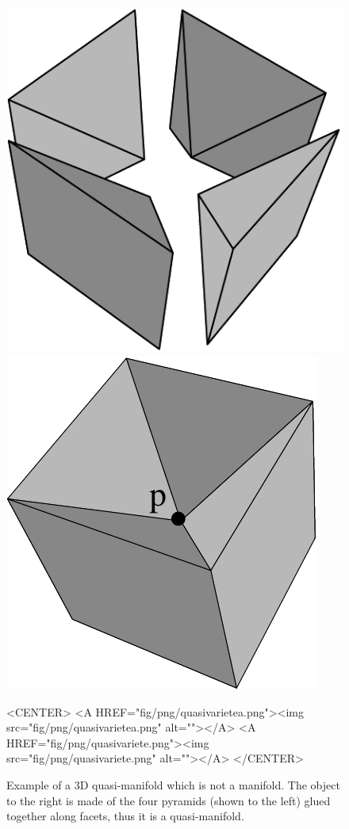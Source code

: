 \begin{figure}
  \begin{ccTexOnly}
    \begin{center}
    \includegraphics[width=.33\textwidth]{Combinatorial_map/fig/pdf/quasivarietea}
    \includegraphics[width=.33\textwidth]{Combinatorial_map/fig/pdf/quasivariete}
    \end{center}
  \end{ccTexOnly}
  \begin{ccHtmlOnly}
    <CENTER>
    <A HREF="fig/png/quasivarietea.png"><img src="fig/png/quasivarietea.png" alt=""></A>
    <A HREF="fig/png/quasivariete.png"><img src="fig/png/quasivariete.png" alt=""></A>
    </CENTER>
  \end{ccHtmlOnly} 
  \caption{Example of a 3D quasi-manifold which is not a manifold.
    The object to the right is made of the four pyramids (shown to the
    left) glued together along facets, thus it is a quasi-manifold.}
  \label{fig-quasivariete}
\end{figure}

